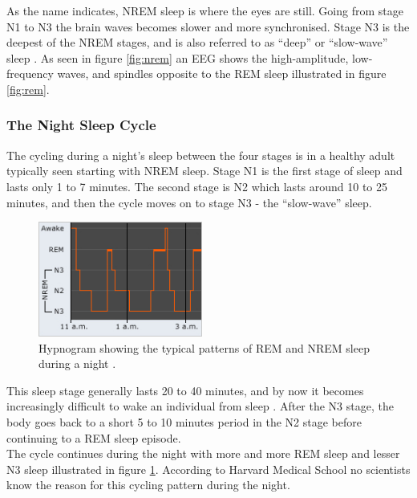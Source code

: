 \documentclass[12pt]{article} %
\begin{document}
As the name indicates, NREM sleep is where the eyes are still. Going from stage N1 to N3 the brain waves becomes slower and more synchronised. Stage N3 is the deepest of the NREM stages, and is also referred to as ``deep'' or ``slow-wave'' sleep \cite{harvard}. As seen in figure \ref{fig:nrem} an EEG shows the high-amplitude, low-frequency waves, and spindles opposite to the REM sleep illustrated in figure \ref{fig:rem}. 


\subsubsection{The Night Sleep Cycle}
The cycling during a night's sleep between the four stages is in a healthy adult typically seen starting with NREM sleep. Stage N1 is the first stage of sleep and lasts only 1 to 7 minutes. The second stage is N2 which lasts around 10 to 25 minutes, and then the cycle moves on to stage N3 - the ``slow-wave'' sleep. 

\begin{figure}
  \begin{center}
    \includegraphics[width=0.48\textwidth]{img/hyp}
  \end{center}
    \vspace{-20pt}
  \caption{Hypnogram showing the typical patterns of REM and NREM sleep during a night \cite{harvard}.}
  \label{fig:hyp}
\end{figure}

This sleep stage generally lasts 20 to 40 minutes, and by now it becomes increasingly difficult to wake an individual from sleep \cite{harvard}. After the N3 stage, the body goes back to a short 5 to 10 minutes period in the N2 stage before continuing to a REM sleep episode. \\

The cycle continues during the night with more and more REM sleep and lesser N3 sleep illustrated in figure \ref{fig:hyp}. According to Harvard Medical School \cite{harvard} no scientists know the reason for this cycling pattern during the night. 
\end{document}
